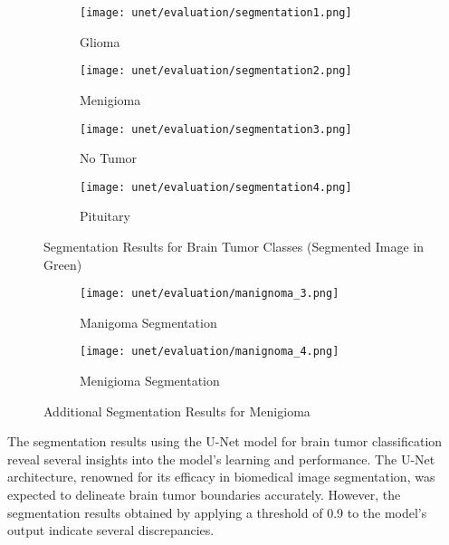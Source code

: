 \begin{figure}[H]
  \centering
  \begin{subfigure}[b]{0.23\textwidth}
    \centering
    \texttt{[image: unet/evaluation/segmentation1.png]}
    \caption{Glioma}
    \label{fig:glio_seg}
  \end{subfigure}
  \hfill
  \begin{subfigure}[b]{0.23\textwidth}
    \centering
    \texttt{[image: unet/evaluation/segmentation2.png]}
    \caption{Menigioma}
    \label{fig:meng_seg}
  \end{subfigure}
  \hfill
  \begin{subfigure}[b]{0.23\textwidth}
    \centering
    \texttt{[image: unet/evaluation/segmentation3.png]}
    \caption{No Tumor}
    \label{fig:no_tumor_seg}
  \end{subfigure}
  \hfill
  \begin{subfigure}[b]{0.23\textwidth}
    \centering
    \texttt{[image: unet/evaluation/segmentation4.png]}
    \caption{Pituitary}
    \label{fig:pitu_seg}
  \end{subfigure}
  \caption{Segmentation Results for Brain Tumor Classes (Segmented Image in Green)}
  \label{fig:segmentation_results}
\end{figure}

\begin{figure}[H]
  \centering
  \begin{subfigure}[b]{0.43\textwidth}
    \centering
    \texttt{[image: unet/evaluation/manignoma\_3.png]}
    \caption{Manigoma Segmentation}
    \label{fig:manignoma_1}
  \end{subfigure}
  \hfill
  \begin{subfigure}[b]{0.43\textwidth}
    \centering
    \texttt{[image: unet/evaluation/manignoma\_4.png]}
    \caption{Menigioma Segmentation}
    \label{fig:mengioma_2}
  \end{subfigure}
  \caption{Additional Segmentation Results for Menigioma}
  \label{fig:malignoma_segmentation}
\end{figure}

The segmentation results using the U-Net model for brain tumor classification reveal several insights into the model's learning and performance. The U-Net architecture, renowned for its efficacy in biomedical image segmentation, was expected to delineate brain tumor boundaries accurately. However, the segmentation results obtained by applying a threshold of 0.9 to the model's output indicate several discrepancies.

